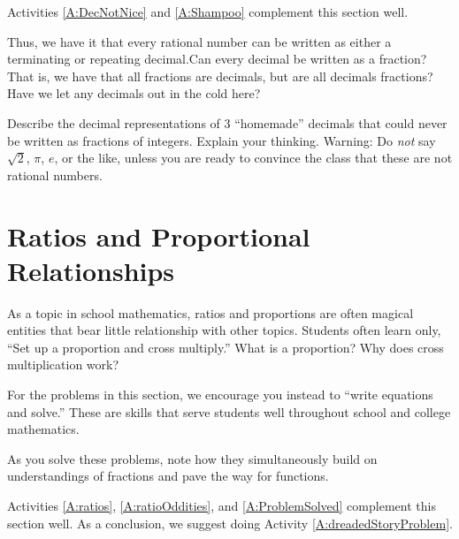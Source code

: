 \begin{activitynote}
Activities \ref{A:DecNotNice} and \ref{A:Shampoo} complement this section well. 
\end{activitynote}

Thus, we have it that every rational number can be written as either a terminating or repeating decimal.Can every decimal be written as a fraction?  That is, we have that all fractions are decimals, but are all decimals fractions?  Have we let any decimals out in the cold here?

\begin{question} Describe the decimal representations of 3 ``homemade'' decimals that could never be written as fractions of integers.  Explain your thinking.  Warning:  Do \emph{not} say  $\sqrt{2}$, $\pi$, $e$, or the like, unless you are ready to convince the class that these are not rational numbers.
\end{question}
\QM

\newpage
\section{Ratios and Proportional Relationships}
As a topic in school mathematics, ratios and proportions are often magical entities that bear little relationship with other topics.  Students often learn only, ``Set up a proportion and cross multiply.''   What is a proportion?  Why does cross multiplication work?  

For the problems in this section, we encourage you instead to ``write equations and solve.''  These are skills that serve students well throughout school and college mathematics.  

As you solve these problems, note how they simultaneously build on understandings of fractions and pave the way for functions.  


\begin{activitynote}
Activities \ref{A:ratios},  \ref{A:ratioOddities}, and \ref{A:ProblemSolved} complement this section well. 
As a conclusion, we suggest doing Activity \ref{A:dreadedStoryProblem}.
\end{activitynote}

\newpage

